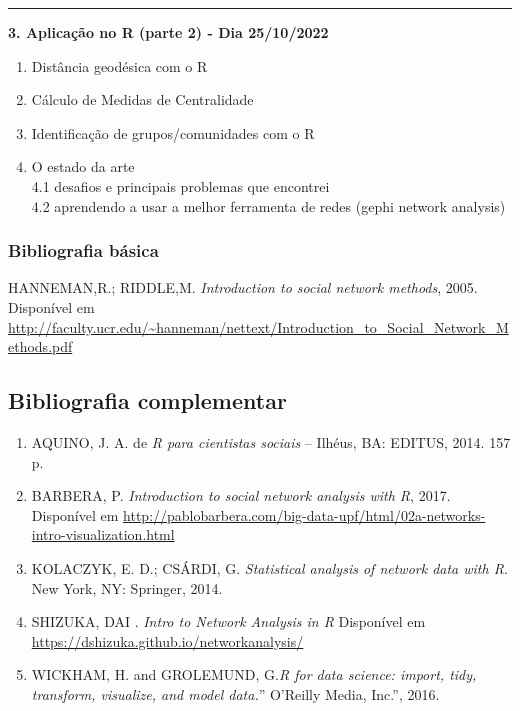 \documentclass[
]{article}
\providecommand{\tightlist}{%
  \setlength{\itemsep}{0pt}\setlength{\parskip}{0pt}}
\def\fullboxbegin{
\bigskip
\begin{tcolorbox}[colback=color1,colframe=color1,coltext=white,arc=0mm,boxrule=0pt]
}
\def\fullboxend{\end{tcolorbox}\medskip}
\begin{document}
\begin{center}\rule{0.5\linewidth}{0.5pt}\end{center}

\textbf{3. Aplicação no R (parte 2) - Dia 25/10/2022}

\begin{enumerate}
\def\labelenumi{\arabic{enumi}.}
\tightlist
\item
  Distância geodésica com o R\\
\item
  Cálculo de Medidas de Centralidade\\
\item
  Identificação de grupos/comunidades com o R\\
\item
  O estado da arte\\
  4.1 desafios e principais problemas que encontrei\\
  4.2 aprendendo a usar a melhor ferramenta de redes (gephi network
  analysis)
\end{enumerate}

\fullboxbegin

\hypertarget{bibliografia-buxe1sica}{%
\subsubsection{Bibliografia básica}\label{bibliografia-buxe1sica}}

HANNEMAN,R.; RIDDLE,M. \emph{Introduction to social network methods},
2005. Disponível em
\url{http://faculty.ucr.edu/~hanneman/nettext/Introduction_to_Social_Network_Methods.pdf}

\fullboxend

\hypertarget{bibliografia-complementar}{%
\subsection{Bibliografia complementar}\label{bibliografia-complementar}}

\begin{enumerate}
\def\labelenumi{\arabic{enumi}.}
\item
  AQUINO, J. A. de \emph{R para cientistas sociais} -- Ilhéus, BA:
  EDITUS, 2014. 157 p.
\item
  BARBERA, P. \emph{Introduction to social network analysis with R},
  2017. Disponível em
  \url{http://pablobarbera.com/big-data-upf/html/02a-networks-intro-visualization.html}
\item
  KOLACZYK, E. D.; CSÁRDI, G. \emph{Statistical analysis of network data
  with R}. New York, NY: Springer, 2014.
\item
  SHIZUKA, DAI . \emph{Intro to Network Analysis in R} Disponível em
  \url{https://dshizuka.github.io/networkanalysis/}
\item
  WICKHAM, H. and GROLEMUND, G.\emph{R for data science: import, tidy,
  transform, visualize, and model data.}'' O'Reilly Media, Inc.'', 2016.
\end{enumerate}
\end{document}
